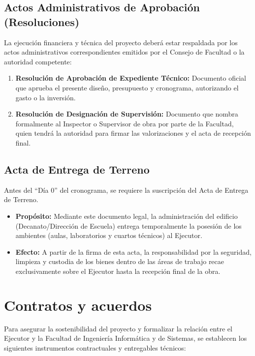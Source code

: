 \subsection*{Actos Administrativos de Aprobación (Resoluciones)}

La ejecución financiera y técnica del proyecto deberá estar respaldada por los actos administrativos correspondientes emitidos por el Consejo de Facultad o la autoridad competente:

\begin{enumerate}
    \item \textbf{Resolución de Aprobación de Expediente Técnico:} Documento oficial que aprueba el presente diseño, presupuesto y cronograma, autorizando el gasto o la inversión.
    \item \textbf{Resolución de Designación de Supervisión:} Documento que nombra formalmente al Inspector o Supervisor de obra por parte de la Facultad, quien tendrá la autoridad para firmar las valorizaciones y el acta de recepción final.
\end{enumerate}

\subsection*{Acta de Entrega de Terreno}

Antes del ``Día 0'' del cronograma, se requiere la suscripción del Acta de Entrega de Terreno.

\begin{itemize}
    \item \textbf{Propósito:} Mediante este documento legal, la administración del edificio (Decanato/Dirección de Escuela) entrega temporalmente la posesión de los ambientes (aulas, laboratorios y cuartos técnicos) al Ejecutor.
    \item \textbf{Efecto:} A partir de la firma de esta acta, la responsabilidad por la seguridad, limpieza y custodia de los bienes dentro de las áreas de trabajo recae exclusivamente sobre el Ejecutor hasta la recepción final de la obra.
\end{itemize}

\section{Contratos y acuerdos}

Para asegurar la sostenibilidad del proyecto y formalizar la relación entre el Ejecutor y la Facultad de Ingeniería Informática y de Sistemas, se establecen los siguientes instrumentos contractuales y entregables técnicos:

